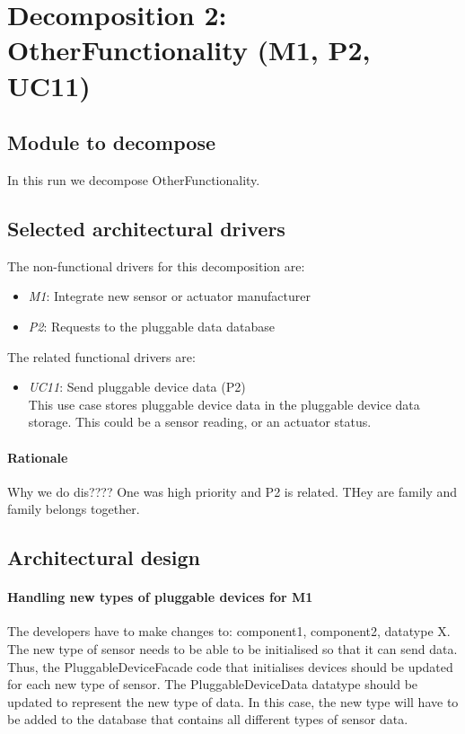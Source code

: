 \section{Decomposition 2: OtherFunctionality (M1, P2, UC11)}

\subsection{Module to decompose}
    In this run we decompose OtherFunctionality.


\subsection{Selected architectural drivers}
    The non-functional drivers for this decomposition are:
    \begin{itemize}
    	\item \emph{M1}: Integrate new sensor or actuator manufacturer
        \item \emph{P2}: Requests to the pluggable data database
    \end{itemize}

    \noindent The related functional drivers are:
    \begin{itemize}
        \item \emph{UC11}: Send pluggable device data (P2) \\
              This use case stores pluggable device data in the pluggable device data storage.
              This could be a sensor reading, or an actuator status.
    \end{itemize}

    \paragraph{Rationale}
        Why we do dis???? One was high priority and P2 is related. THey are family and family belongs together.


\subsection{Architectural design}
    \paragraph{Handling new types of pluggable devices for M1}
        The developers have to make changes to: component1, component2, datatype X.
        The new type of sensor needs to be able to be initialised so that it can send data.
        Thus, the PluggableDeviceFacade code that initialises devices should be updated for
        each new type of sensor. The PluggableDeviceData datatype should be updated to
        represent the new type of data. In this case, the new type will have to be added
        to the database that contains all different types of sensor data.

